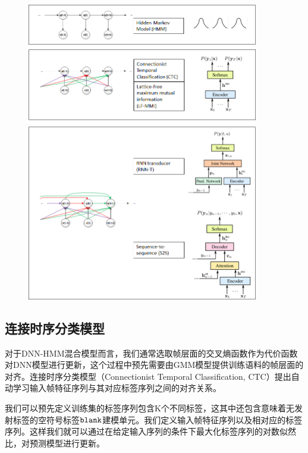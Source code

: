 \begin{figure}[!htp]
  \centering
    \captionstyle{\centering}
    \includegraphics[clip=true, width=0.9\textwidth]{figure/e2e.png}
\end{figure}


\subsection{连接时序分类模型}
\label{chap:intro2-e2e-ctc}

对于DNN-HMM混合模型而言，我们通常选取帧层面的交叉熵函数作为代价函数对DNN模型进行更新，这个过程中预先需要由GMM模型提供训练语料的帧层面的对齐。连接时序分类模型（Connectionist Temporal Classification, CTC）提出自动学习输入帧特征序列与其对应标签序列之间的对齐关系。

我们可以预先定义训练集的标签序列包含K个不同标签，这其中还包含意味着无发射标签的空符号标签$\tt blank$建模单元。我们定义输入帧特征序列以及相对应的标签序列。这样我们就可以通过在给定输入序列的条件下最大化标签序列的对数似然比，对预测模型进行更新。

